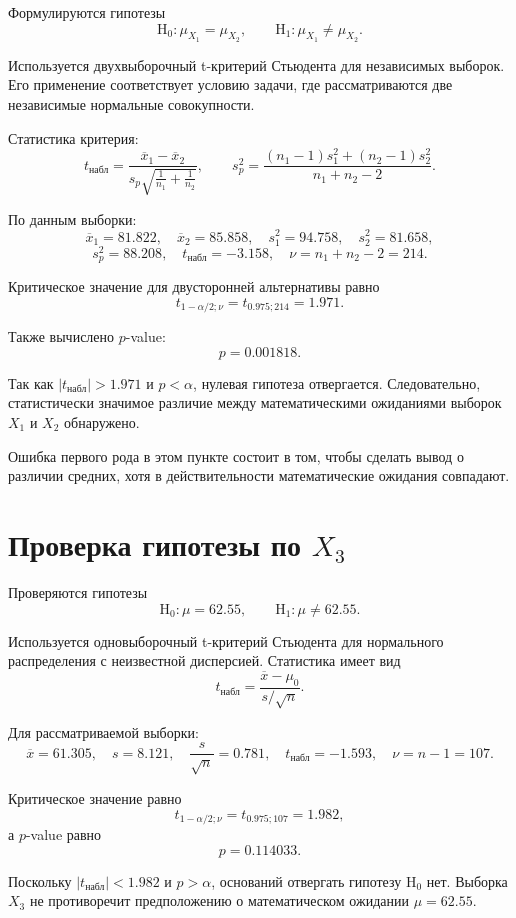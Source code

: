 \documentclass[12pt,a4paper]{article}
\newcommand{\num}[1]{#1}
\newcommand{\hypnull}{\mathrm{H}_0}
\newcommand{\hypalt}{\mathrm{H}_1}
\begin{document}
Формулируются гипотезы
\[
\hypnull\colon \mu_{X_1}=\mu_{X_2}, \qquad
\hypalt\colon \mu_{X_1}\neq \mu_{X_2}.
\]

Используется двухвыборочный t-критерий Стьюдента для независимых выборок. Его применение соответствует условию задачи, где рассматриваются две независимые нормальные совокупности.

Статистика критерия:
\[
t_{\text{набл}}=
\frac{\overline{x}_1-\overline{x}_2}
{s_p \sqrt{\frac{1}{n_1}+\frac{1}{n_2}}},
\qquad
s_p^2=\frac{(n_1-1)s_1^2+(n_2-1)s_2^2}{n_1+n_2-2}.
\]

По данным выборки:
\[
\overline{x}_1=\num{81.822}, \quad
\overline{x}_2=\num{85.858}, \quad
s_1^2=\num{94.758}, \quad
s_2^2=\num{81.658},
\]
\[
s_p^2=\num{88.208}, \quad
t_{\text{набл}}=\num{-3.158}, \quad
\nu=n_1+n_2-2=\num{214}.
\]

Критическое значение для двусторонней альтернативы равно
\[
t_{1-\alpha/2;\nu}=t_{0.975;214}=\num{1.971}.
\]

Также вычислено $p$-value:
\[
p=\num{0.001818}.
\]

Так как $|t_{\text{набл}}|>\num{1.971}$ и $p<\alpha$, нулевая гипотеза отвергается. Следовательно, статистически значимое различие между математическими ожиданиями выборок $X_1$ и $X_2$ обнаружено.

Ошибка первого рода в этом пункте состоит в том, чтобы сделать вывод о различии средних, хотя в действительности математические ожидания совпадают.

\section{Проверка гипотезы по $X_3$}

Проверяются гипотезы
\[
\hypnull\colon \mu=\num{62.55}, \qquad
\hypalt\colon \mu\neq \num{62.55}.
\]

Используется одновыборочный t-критерий Стьюдента для нормального распределения с неизвестной дисперсией. Статистика имеет вид
\[
t_{\text{набл}}=\frac{\overline{x}-\mu_0}{s/\sqrt{n}}.
\]

Для рассматриваемой выборки:
\[
\overline{x}=\num{61.305}, \quad
s=\num{8.121}, \quad
\frac{s}{\sqrt{n}}=\num{0.781}, \quad
t_{\text{набл}}=\num{-1.593}, \quad
\nu=n-1=\num{107}.
\]

Критическое значение равно
\[
t_{1-\alpha/2;\nu}=t_{0.975;107}=\num{1.982},
\]
а $p$-value равно
\[
p=\num{0.114033}.
\]

Поскольку $|t_{\text{набл}}|<\num{1.982}$ и $p>\alpha$, оснований отвергать гипотезу $\hypnull$ нет. Выборка $X_3$ не противоречит предположению о математическом ожидании $\mu=\num{62.55}$.
\end{document}
